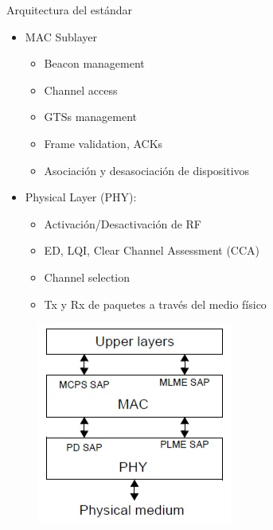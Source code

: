 \documentclass[aspectratio=169]{beamer}
\begin{document}
\begin{frame}{Arquitectura del estándar}

\begin{minipage}[c]{1.0\linewidth}
	\begin{minipage}[c]{0.6\linewidth}
		\begin{itemize}
			\item MAC Sublayer
			\begin{itemize}
				\item Beacon management
				\item Channel access
				\item GTSs management
				\item Frame validation, ACKs
				\item Asociación y desasociación de dispositivos
			\end{itemize}
			\vspace{10px}
			\item Physical Layer (PHY):
			\begin{itemize}
				\item Activación/Desactivación de RF
				\item ED, LQI, Clear Channel Assessment (CCA)
				\item Channel selection
				\item Tx y Rx de paquetes a través del medio físico
			\end{itemize}
			\vspace{10px}
		\end{itemize}	
	  \end{minipage}
	  \begin{minipage}[c]{0.35\linewidth}
		\begin{figure}[H]
			{\includegraphics[width=.6\textwidth]{./imagenes/arquitectura}}
		\end{figure}	  	  	
	  \end{minipage}
\end{minipage}

\end{frame}
\end{document}
